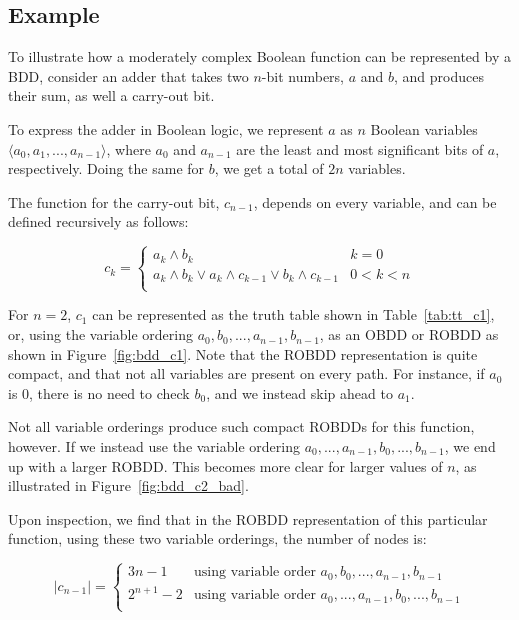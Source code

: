 \documentclass[a4paper,11pt]{kth-mag}
\newcommand{\AND}{\land}
\newcommand{\IOR}{\lor}
\begin{document}
\subsection{Example}

To illustrate how a moderately complex Boolean function can be represented by a BDD, consider an adder that takes two $n$-bit numbers, $a$ and $b$, and produces their sum, as well a carry-out bit.

To express the adder in Boolean logic, we represent $a$ as $n$ Boolean variables $\langle a_0, a_1, ..., a_{n-1} \rangle$, where $a_0$ and $a_{n-1}$ are the least and most significant bits of $a$, respectively.
Doing the same for $b$, we get a total of $2n$ variables.

The function for the carry-out bit, $c_{n-1}$, depends on every variable, and can be defined recursively as follows:

$$
  c_k = \left\{
  \begin{array}{ll}
    a_k \AND b_k                                             & k = 0 \\
    a_k \AND b_k \IOR a_k \AND c_{k-1} \IOR b_k \AND c_{k-1} & 0 < k < n \\
  \end{array}\right.
$$

For $n = 2$, $c_1$ can be represented as the truth table shown in Table~\ref{tab:tt_c1}, or, using the variable ordering $a_0,b_0,...,a_{n-1},b_{n-1}$, as an OBDD or ROBDD as shown in Figure~\ref{fig:bdd_c1}.
Note that the ROBDD representation is quite compact, and that not all variables are present on every path.
For instance, if $a_0$ is 0, there is no need to check $b_0$, and we instead skip ahead to $a_1$.

Not all variable orderings produce such compact ROBDDs for this function, however.
If we instead use the variable ordering $a_0,...,a_{n-1},b_0,...,b_{n-1}$, we end up with a larger ROBDD.
This becomes more clear for larger values of $n$, as illustrated in Figure~\ref{fig:bdd_c2_bad}.

Upon inspection, we find that in the ROBDD representation of this particular function, using these two variable orderings, the number of nodes is:

$$
  |c_{n-1}| = \left\{
  \begin{array}{ll}
    3n-1      & \textrm{using variable order $a_0,b_0,...,a_{n-1},b_{n-1}$} \\
    2^{n+1}-2 & \textrm{using variable order $a_0,...,a_{n-1},b_0,...,b_{n-1}$} \\
  \end{array}\right.
$$
\end{document}
